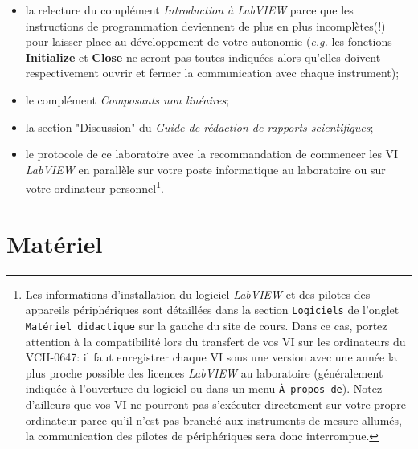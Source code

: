 \documentclass[canadien,12pt,oneside,letterpaper]{article}
\begin{document}
\begin{itemize} \itemsep4pt
\item la relecture du complément \textit{Introduction à LabVIEW} parce que les instructions de programmation deviennent de plus en plus incomplètes(!) pour laisser place au développement de votre autonomie (\textit{e.g.} les fonctions \textbf{Initialize} et \textbf{Close} ne seront pas toutes indiquées alors qu'elles doivent respectivement ouvrir et fermer la communication avec chaque instrument); 
\item le complément \textit{Composants non linéaires};
\item la section "Discussion" du \textit{Guide de rédaction de rapports scientifiques};
\item le protocole de ce laboratoire avec la recommandation de commencer les VI \textit{LabVIEW} en parallèle sur votre poste informatique au laboratoire ou sur votre ordinateur personnel\footnote{Les informations d'installation du logiciel \textit{LabVIEW} et des pilotes des appareils périphériques sont détaillées dans la section \texttt{Logiciels} de l'onglet \texttt{Matériel didactique} sur la gauche du site de cours. Dans ce cas, portez attention à la compatibilité lors du transfert de vos VI sur les ordinateurs du VCH-0647: il faut enregistrer chaque VI sous une version avec une année la plus proche possible des licences \textit{LabVIEW} au laboratoire (généralement indiquée à l'ouverture du logiciel ou dans un menu \texttt{À propos de}). Notez d'ailleurs que vos VI ne pourront pas s'exécuter directement sur votre propre ordinateur parce qu'il n'est pas branché aux instruments de mesure allumés, la communication des pilotes de périphériques sera donc interrompue.}.
\end{itemize}

\vspace{1ex}
\noindent{}

\section{Matériel}
\end{document}
